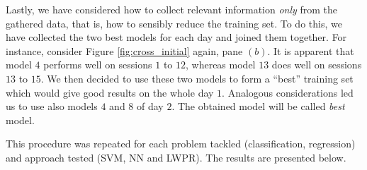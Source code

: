 Lastly, we have considered how to collect relevant information
\emph{only} from the gathered data, that is, how to sensibly reduce
the training set. To do this, we have collected the two best models
for each day and joined them together. For instance, consider Figure
\ref{fig:cross_initial} again, pane $(b)$. It is apparent that model
$4$ performs well on sessions $1$ to $12$, whereas model $13$ does
well on sessions $13$ to $15$. We then decided to use these two models
to form a ``best'' training set which would give good results on the
whole day $1$. Analogous considerations led us to use also models $4$
and $8$ of day $2$. The obtained model will be called \emph{best}
model.

This procedure was repeated for each problem tackled (classification,
regression) and approach tested (SVM, NN and LWPR). The results are
presented below.
